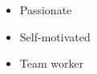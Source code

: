%
%
%

\twocolumnsection
{
	\begin{skills}
	\end{skills}}
{
	\vspace{1em}
	\begin{itemize}
		\item Passionate
		\item Self-motivated
		\item Team worker
	\end{itemize}
}
